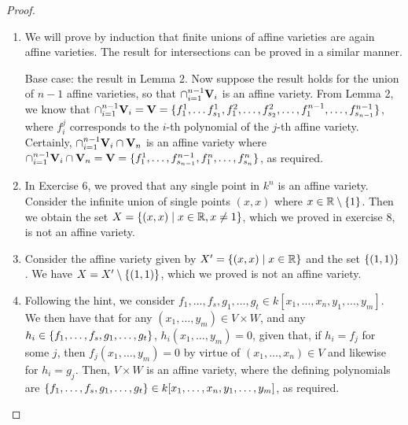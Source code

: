 \begin{proof}
    \begin{enumerate}
        \item We will prove by induction that finite unions of affine varieties are again affine varieties. 
        The result for intersections can be proved in a similar manner. 

        Base case: 
        the result in Lemma 2. 
        Now suppose the result holds for the union of $n-1$ affine varieties, so that $\cap_{i=1}^{n-1}\mathbf{V}_i$ is an affine variety. 
        From Lemma 2, we know that $\cap_{i=1}^{n-1}\mathbf{V}_i= \mathbf{V}= {\{f_1^1,\dots f_{s_1}^1,f_1^2,\dots,f_{s_2}^2,\dots,f_1^{n-1},\dots,f_{s_{n-1}}^{n-1}\}}$, where $f_i^j$ corresponds to the $i$-th polynomial of the $j$-th affine variety. 
        Certainly, $\cap_{i=1}^{n-1}\mathbf{V}_i\cap \mathbf{V}_n$ is an affine variety where $\cap_{i=1}^{n-1}\mathbf{V}_i\cap \mathbf{V}_n = \mathbf{V}=\{f_1^1,\dots,f_{s_{n-1}}^{n-1},f_1^n,\dots,f_{s_n}^n\}$, as required.
        \item In Exercise 6, we proved that any single point in $k^n$ is an affine variety. 
        Consider the infinite union of single points $(x,x)$ where $x \in \mathbb{R} \setminus \{1\}$. 
        Then we obtain the set $X=\{(x,x)\mid x\in\mathbb{R},x\neq 1\}$, which we proved in exercise 8, is not an affine variety.
        \item Consider the affine variety given by $X'=\{(x,x)\mid x\in\mathbb{R}\}$ and the set $\{(1,1)\}$. 
        We have $X=X'\setminus\{(1,1)\}$, which we proved is not an affine variety.
        \item Following the hint, we consider $f_1,\dots,f_s,g_1,\dots,g_t\in k[x_1,\dots,x_n,y_1,\dots,y_m]$. 
        We then have that for any $(x_1,\dots,y_m)\in V\times W$, and any $h_i \in \{f_1,\dots,f_s,g_1,\dots,g_t\}$, $h_i(x_1,\dots,y_m)=0$, given that, if $h_i=f_j$ for some $j$, then $f_j(x_1,\dots,y_m)=0$ by virtue of $(x_1,\dots,x_n)\in V$ and likewise for $h_i=g_j$. 
        Then, $V\times W$ is an affine variety, where the defining polynomials are $\{f_1,\dots,f_s,g_1,\dots,g_t\}\in k[x_1,\dots,x_n,y_1,\dots,y_m]$, as required.
    \end{enumerate}
\end{proof}